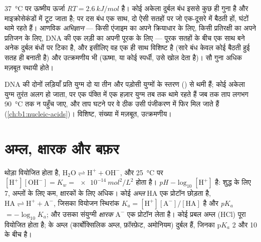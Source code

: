 \begin{proposition}[दुर्बल बंध ही जीवविज्ञान के बंध क्यों हैं]\label{prop:b1:water-small-molecules:weak}
\qty{37}{\celsius} पर ऊष्मीय ऊर्जा $RT = \qty{2.6}{kJ/mol}$ है। कोई
अकेला दुर्बल बंध इससे कुछ ही गुना है और माइक्रोसेकंडों में टूट जाता है;
पर दस बंध एक साथ, दो ऐसी सतहों पर जो एक-दूसरे में बैठती हों, घंटों थामे
रहते हैं। आणविक \emph{अभिज्ञान} --- किसी एंजाइम
का अपने क्रियाधार के लिए, किसी प्रतिरक्षी का अपने प्रतिजन के लिए, DNA की
एक लड़ी का अपनी पूरक के लिए --- पूरक सतहों के बीच एक साथ बने अनेक दुर्बल
बंधों पर टिका है, और इसीलिए वह एक ही साथ विशिष्ट है (सारे बंध केवल कोई
बैठती हुई सतह ही बनाती है) और उत्क्रमणीय भी (ऊष्मा, या कोई स्पर्धी, उसे
खोल देता है)। सौ गुना अधिक मज़बूत  स्थायी होते।
\end{proposition}

\begin{example}[किसी द्विकुंडली को पिघलाना]\label{ex:b1:water-small-molecules:melting}
DNA की दोनों लड़ियाँ प्रति  युग्म दो या तीन  और
पड़ोसी युग्मों के स्तरण () से थमी हैं; कोई अकेला युग्म तुरंत
अलग हो जाता, पर एक पंक्ति में एक हज़ार युग्म तब तक थामे रहते हैं जब तक
ताप लगभग \qty{90}{\celsius} तक न पहुँच जाए, और ताप घटने पर वे ठीक उसी
पंजीकरण में फिर मिल जाते हैं (\cref{ch:b1:nucleic-acids})। विशिष्ट,
संख्या में मज़बूत, उत्क्रमणीय।
\end{example}

\section{अम्ल, क्षारक और बफ़र}

\begin{definition}[pH, अम्ल, क्षारक, p$K_a$]\label{def:b1:water-small-molecules:ph}
 थोड़ा वियोजित होता है, $\mathrm{H_2O} \rightleftharpoons
\mathrm{H^+} + \mathrm{OH^-}$, और \qty{25}{\celsius} पर
$[\mathrm{H^+}][\mathrm{OH^-}] =
K_w = \qty{e-14}{mol^2/L^2}$ होता है।
\emph{pH} $-\log_{10}[\mathrm{H^+}]$ है: शुद्ध  के लिए 7,
अम्लों के लिए कम, क्षारकों के लिए अधिक। कोई \emph{अम्ल} $\mathrm{HA}$
एक प्रोटॉन छोड़ता है, $\mathrm{HA} \rightleftharpoons \mathrm{H^+} +
\mathrm{A^-}$, जिसका वियोजन स्थिरांक $K_a =
[\mathrm{H^+}][\mathrm{A^-}]/[\mathrm{HA}]$ है और
\emph{p$K_a$} $= -\log_{10}K_a$; और उसका संयुग्मी
\emph{क्षारक} $\mathrm{A^-}$ एक प्रोटॉन लेता है। कोई प्रबल
अम्ल (HCl) पूरा वियोजित होता है;  के अम्ल (कार्बोक्सिलिक अम्ल,
फ़ॉस्फ़ेट, अमोनियम) दुर्बल हैं, जिनका p$K_a$ 2 और 10 के बीच है।
\end{definition}

